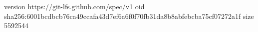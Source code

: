 version https://git-lfs.github.com/spec/v1
oid sha256:6001bcdbcb76ca49ccafa43d7ef6a6f0f70fb31da8b8abfebcba75cf07272a1f
size 5592544
